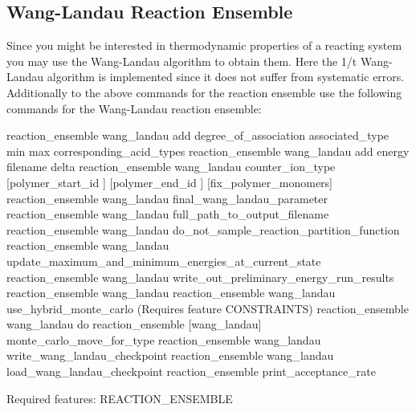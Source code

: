 \subsection{Wang-Landau Reaction Ensemble}
  Since you might be interested in thermodynamic properties of a reacting system you may use the Wang-Landau algorithm\cite{wang2001efficient} to obtain them. Here the 1/t Wang-Landau algorithm\cite{belardinelli2007fast} is implemented since it does not suffer from systematic errors.
  Additionally to the above commands for the reaction ensemble use the following commands for the Wang-Landau reaction ensemble:
  \begin{essyntax}
   reaction\_ensemble wang_landau add degree\_of\_association associated\_type  min  max  corresponding\_acid\_types 
   reaction\_ensemble wang\_landau add energy filename  delta 
   reaction\_ensemble wang\_landau counter\_ion\_type  [polymer\_start\_id ] [polymer\_end\_id ] [fix_polymer_monomers] 
   reaction\_ensemble wang\_landau final\_wang\_landau\_parameter 
   reaction\_ensemble wang\_landau full\_path\_to\_output\_filename 
   reaction\_ensemble wang\_landau do\_not\_sample\_reaction\_partition\_function
   reaction\_ensemble wang\_landau update\_maximum\_and\_minimum\_energies\_at\_current\_state
   reaction\_ensemble wang\_landau write\_out\_preliminary\_energy\_run\_results 
   reaction_ensemble wang_landau 
     reaction\_ensemble wang\_landau use\_hybrid\_monte\_carlo (Requires feature CONSTRAINTS)
   reaction\_ensemble wang\_landau do
   reaction\_ensemble [wang\_landau] monte\_carlo\_move\_for\_type 
   reaction\_ensemble wang\_landau write\_wang\_landau\_checkpoint 
   reaction\_ensemble wang\_landau load\_wang\_landau\_checkpoint 
   reaction\_ensemble print\_acceptance\_rate
  
  Required features: REACTION\_ENSEMBLE
\end{essyntax}

